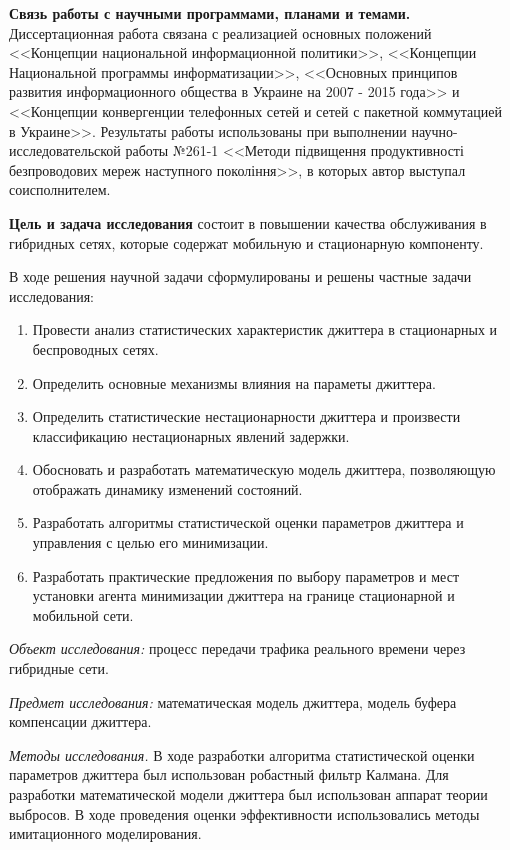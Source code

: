 \textbf{Связь работы с научными программами, планами и темами.} Диссертационная работа связана с реализацией основных положений <<Концепции национальной информационной политики>>, <<Концепции Национальной программы информатизации>>, <<Основных принципов развития информационного общества в Украине на 2007 - 2015 года>> и <<Концепции конвергенции телефонных сетей и сетей с пакетной коммутацией в Украине>>.
Результаты работы использованы при выполнении научно-исследовательской работы №261-1 <<Методи підвищення продуктивності безпроводових мереж наступного покоління>>, в которых автор выступал соисполнителем.

\textbf{Цель и задача исследования} состоит в повышении качества обслуживания в гибридных сетях, которые содержат мобильную и стационарную компоненту.

В ходе решения научной задачи сформулированы и решены частные задачи исследования:
\begin{enumerate}
  \item Провести анализ статистических характеристик джиттера в стационарных и беспроводных сетях.
  \item Определить основные механизмы влияния на параметы джиттера.
  \item Определить статистические нестационарности джиттера и произвести классификацию нестационарных явлений задержки.
  \item Обосновать и разработать математическую модель джиттера, позволяющую отображать динамику изменений состояний.
  \item Разработать алгоритмы статистической оценки параметров джиттера и управления с целью его минимизации.
  \item Разработать практические предложения по выбору параметров и мест установки агента минимизации джиттера на границе стационарной и мобильной сети.
\end{enumerate}

{\itshape Объект исследования:} процесс передачи трафика реального времени через гибридные сети.

{\itshape Предмет исследования:} математическая модель джиттера, модель буфера компенсации джиттера.

{\itshape Методы исследования.} В ходе разработки алгоритма статистической оценки параметров джиттера был использован робастный фильтр Калмана. Для разработки математической модели джиттера был использован аппарат теории выбросов. В ходе проведения оценки эффективности использовались методы имитационного моделирования.


